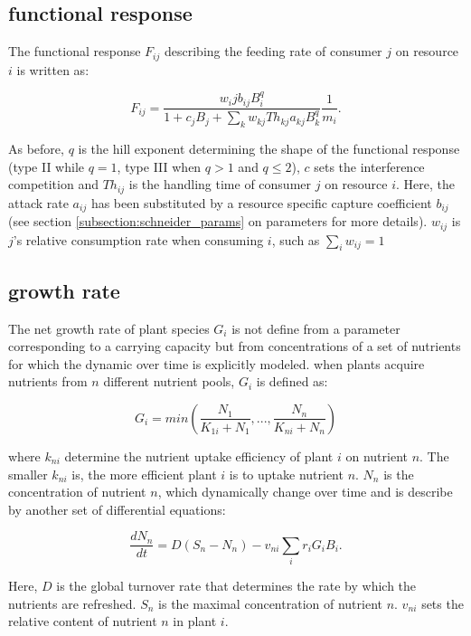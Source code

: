 \documentclass[12pt,a4paper]{article}
\begin{document}
\subsection{functional response}

The functional response $F_{ij}$ describing the feeding rate of consumer $j$ on resource $i$ is written as: 

\begin{equation}
F_{ij} = \frac{w_ijb_{ij}B_i^q}{1 + c_jB_j + \sum_kw_{kj}Th_{kj}a_{kj}B_k^q}\frac{1}{m_i}.
\end{equation}

As before, $q$ is the hill exponent determining the shape of the functional response (type II while $q = 1$, type III when $q > 1$ and $q\leq2$), $c$ sets the interference competition and $Th_{ij}$ is the handling time of consumer $j$ on resource $i$. Here, the attack rate $a_{ij}$ has been substituted by a resource specific capture coefficient $b_{ij}$ (see section \ref{subsection:schneider_params} on parameters for more details). $w_{ij}$ is $j$'s relative consumption rate when consuming $i$, such as $\sum_iw_{ij} = 1$

\subsection{growth rate}

The net growth rate of plant species $G_i$ is not define from a parameter corresponding to a carrying capacity but from concentrations of a set of nutrients for which the dynamic over time is explicitly modeled. when plants acquire nutrients from $n$ different nutrient pools, $G_i$ is defined as:

\begin{equation}
G_i = min\left(\frac{N_1}{K_{1i} + N_1}, ..., \frac{N_n}{K_{ni} + N_n}\right)
\end{equation}

where $k_{ni}$ determine the nutrient uptake efficiency of plant $i$ on nutrient $n$. The smaller $k_{ni}$ is, the more efficient plant $i$ is to uptake nutrient $n$. $N_n$ is the concentration of nutrient $n$, which dynamically change over time and is describe by another set of differential equations:

\begin{equation}
\frac{dN_n}{dt} = D(S_n - N_n) - v_{ni}\sum_ir_iG_iB_i.
\end{equation}

Here, $D$ is the global turnover rate that determines the rate by which the nutrients are refreshed. $S_n$ is the maximal concentration of nutrient $n$. $v_{ni}$ sets the relative content of nutrient $n$ in plant $i$. 
\end{document}

